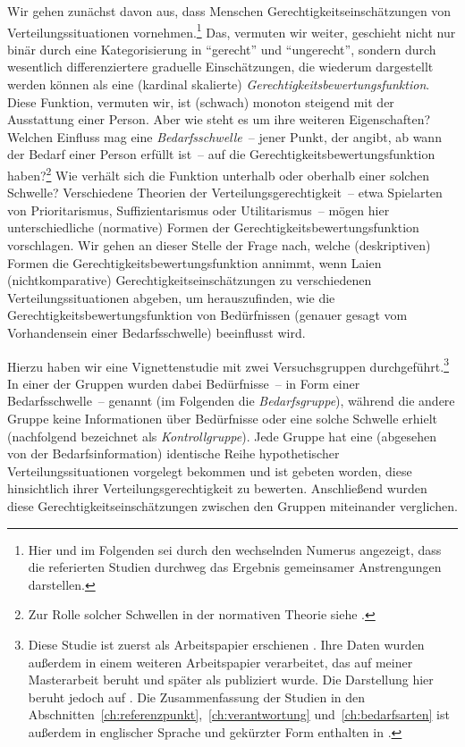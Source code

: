 \documentclass[justified,nobib,nohyper,symmetric,twoside]{tufte-book}
\begin{document}
Wir gehen zunächst davon aus, dass Menschen Gerechtigkeitsein\-schätzungen von Verteilungssituationen vornehmen.\footnote{Hier und im Folgenden sei durch den wechselnden Numerus angezeigt, dass die referierten Studien durchweg das Ergebnis gemeinsamer Anstrengungen darstellen.}
Das, vermuten wir weiter, geschieht nicht nur binär durch eine Kategorisierung in \enquote{gerecht} und \enquote{ungerecht}, sondern durch wesentlich differenziertere graduelle Einschätzungen, die wiederum dargestellt werden können als eine (kardinal skalierte) \textit{Gerechtigkeitsbewertungsfunktion}.
Diese Funktion, vermuten wir, ist (schwach) monoton steigend mit der Ausstattung einer Person.
Aber wie steht es um ihre weiteren Eigenschaften?
Welchen Einfluss mag eine \textit{Bedarfsschwelle}~-- jener Punkt, der angibt, ab wann der Bedarf einer Person erfüllt ist~-- auf die Gerechtigkeitsbewertungsfunktion haben?\footnote{Zur Rolle solcher Schwellen in der normativen Theorie siehe \citet{timmer_thresholds_2021}.}
Wie verhält sich die Funktion unterhalb oder oberhalb einer solchen Schwelle?
Verschiedene Theorien der Verteilungsgerechtigkeit~-- etwa Spielarten von Prioritarismus, Suffizientarismus oder Utilitarismus~-- mögen hier unterschiedliche (normative) Formen der Gerechtigkeitsbewertungsfunktion vorschlagen.
Wir gehen an dieser Stelle der Frage nach, welche (deskriptiven) Formen die Gerechtigkeitsbewertungsfunktion annimmt, wenn Laien (nichtkomparative) Gerechtigkeitseinschätzungen zu verschiedenen Verteilungs\-situationen abgeben, um herauszufinden, wie die Gerechtigkeitsbewertungsfunktion von Bedürfnissen (genauer gesagt vom Vorhandensein einer Bedarfsschwelle) beeinflusst wird.

Hierzu haben wir eine Vignettenstudie mit zwei Versuchsgruppen durchgeführt.\footnote{Diese Studie ist zuerst als Arbeitspapier erschienen \citep{weiss_needs_2017}. Ihre Daten wurden außerdem in einem weiteren Arbeitspapier verarbeitet, das auf meiner Masterarbeit beruht \citep{bauer_monotonie_2018} und später als \citet{bauer_grundlegung_2019} publiziert wurde. Die Darstellung hier beruht jedoch auf \citet{bauer_needs_2023}. Die Zusammenfassung der Studien in den Abschnitten~\ref{ch:referenzpunkt},~\ref{ch:verantwortung} und~\ref{ch:bedarfsarten} ist außerdem in englischer Sprache und gekürzter Form enthalten in \citet{siebel_measuring_nd}.}
In einer der Gruppen wurden dabei Bedürfnisse~-- in Form einer Bedarfsschwelle~-- genannt (im Folgenden die \textit{Bedarfsgruppe}), während die andere Gruppe keine Informationen über Bedürfnisse oder eine solche Schwelle erhielt (nachfolgend bezeichnet als \textit{Kontrollgruppe}). Jede Gruppe hat eine (abgesehen von der Bedarfsinformation) identische Reihe hypothetischer Verteilungssituationen vorgelegt bekommen und ist gebeten worden, diese hinsichtlich ihrer Verteilungsgerechtigkeit zu bewerten.
Anschließend wurden diese Gerechtigkeitseinschätzungen zwischen den Gruppen miteinander verglichen.
\end{document}
